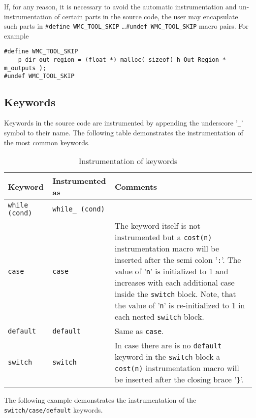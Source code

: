 If, for any reason, it is necessary to avoid the automatic instrumentation and un-instrumentation of certain parts in the source code, the user may encapsulate such parts in \verb|#define WMC_TOOL_SKIP| \ldots \verb|#undef WMC_TOOL_SKIP| macro pairs. For example

\begin{Verbatim}[fontsize=\small]
#define WMC_TOOL_SKIP
    p_dir_out_region = (float *) malloc( sizeof( h_Out_Region * m_outputs );
#undef WMC_TOOL_SKIP
\end{Verbatim}

\subsection{Keywords}

Keywords in the source code are instrumented by appending the underscore '\verb|_|' symbol to their name. The following table demonstrates the instrumentation of the most common keywords.

\begin{table}
\raggedleft\small
\caption{Instrumentation of keywords}
\begin{tabular}{|l|p{}<{\raggedright}|p{}<{\raggedright}|}
\hline
\textbf{Keyword} & \textbf{Instrumented as} & \textbf{Comments} \\
\hline
\verb|while (cond)| & \verb|while_ (cond)| & \\
\hline
\verb|case| & \verb|case| & The keyword itself is not instrumented but a \verb|cost(n)| instrumentation macro will be inserted after the semi colon '\verb|:|'. The value of '\verb|n|' is initialized to 1 and increases with each additional case inside the \verb|switch| block. Note, that the value of '\verb|n|' is re-initialized to 1 in each nested \verb|switch| block. \\
\hline
\verb|default| & \verb|default| & Same as \verb|case|. \\
\hline
\verb|switch| & \verb|switch| & In case there are is no \verb|default| keyword in the \verb|switch| block a \verb|cost(n)| instrumentation macro will be inserted after the closing brace '\verb|}|'. \\
\hline
\end{tabular}
\label{tab:instrumentation_of_keywords}
\end{table}

The following example demonstrates the instrumentation of the \verb|switch/case/default| keywords.

